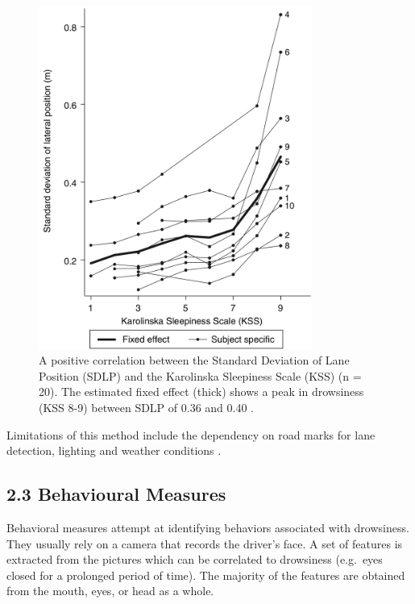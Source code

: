 \documentclass[a4paper]{article}
\begin{document}
\begin{figure}[ht]
    \centering
    \includegraphics[width=0.8\textwidth]{img/lane_position.png}
    \caption{A positive correlation between the Standard
Deviation of Lane Position (SDLP) and the Karolinska Sleepiness Scale
(KSS) (n = 20). The estimated fixed effect (thick) shows a peak in
drowsiness (KSS 8-9) between SDLP of 0.36 and 0.40 \cite{ingre_subjective_2006}. }
    \label{fig:lane_position}
\end{figure}

Limitations of this method include the dependency on road marks for lane detection, lighting and weather
conditions \cite{sahayadhas_detecting_2012}.

\hypertarget{behavioural-measures}{%
\subsection{2.3 Behavioural Measures}\label{behavioural-measures}}

Behavioral measures attempt at identifying behaviors associated with
drowsiness. They usually rely on a camera that records the driver's
face. A set of features is extracted from the pictures which can be
correlated to drowsiness (e.g.~eyes closed for a prolonged period of
time). The majority of the features are obtained from the mouth, eyes,
or head as a whole.
\end{document}
